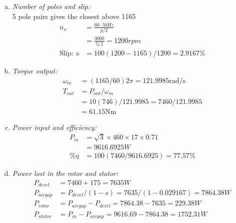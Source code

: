 \documentclass[a4paper,11pt]{article}
\begin{document}
\begin{enumerate}[a)]
    \item \textit{Number of poles and slip:}\\
          5 pole pairs gives the closest above 1165
          \begin{align*}
              n_s               & =\frac{60{\cdot}50Hz}{p/2}          \\
                                & =\frac{3000}{5/2} = 1200rpm   \\
              \mathrm{Slip:\;s} & =100(1200-1165)/1200=2.9167\%
          \end{align*}

    \item \textit{Torque output:}\\
          \begin{align*}
              \omega_m & = (1165/60)2\pi =121.9985 \mathrm{rad/s} \\
              T_{out}  & = P_{out}/\omega_m                       \\
                       & = 10(746)/121.9985=7460/121.9985
              \\&=61.15\mathrm{Nm}
          \end{align*}

    \item \textit{Power input and efficiency:}\\
          \begin{align*}
              P_{in} & = \sqrt{3}\times460\times17\times0.71 \\
                     & =9616.6925W                           \\
              \%\eta & = 100(7460/9616.6925)=77.57\%
          \end{align*}

    \item \textit{Power lost in the rotor and stator:}\\
          \begin{align*}
              P_{devel}  & = 7460+175=7635W                               \\
              P_{airgap} & = P_{devel}/(1-s) = 7635/(1-0.029167)=7864.38W \\
              P_{rotor}  & = P_{airgap}-P_{devel} = 7864.38-7635=229.38W  \\
              P_{stator} & = P_{in}-P_{airgap}=9616.69-7864.38=1752.31W \\
          \end{align*}
\end{enumerate}
\end{document}
